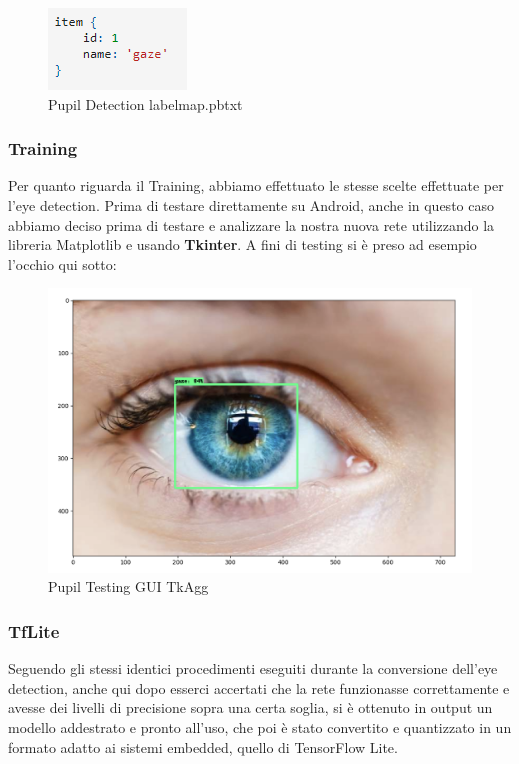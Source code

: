 \documentclass[11pt]{article}
\begin{document}
\begin{figure}[h]
\caption{Pupil Detection labelmap.pbtxt}
\centering
\includegraphics[scale=1]{img/item2.png}
\end{figure}

\subsubsection{Training}
Per quanto riguarda il Training, abbiamo effettuato le stesse scelte effettuate per l'eye detection.
\newline
Prima di testare direttamente su Android, anche in questo caso abbiamo deciso prima di testare e analizzare la nostra nuova rete utilizzando la libreria Matplotlib e usando \textbf{Tkinter}.
\newline
\newline
A fini di testing si è preso ad esempio l'occhio qui sotto:

\begin{figure}[h]
\caption{Pupil Testing GUI TkAgg }
\centering
\includegraphics[scale=0.18]{img/pupilla.png}
\end{figure}

\subsubsection{TfLite}
Seguendo gli stessi identici procedimenti eseguiti durante la conversione dell'eye detection, anche qui dopo esserci accertati che la rete funzionasse correttamente e avesse dei livelli di precisione sopra una certa soglia, si è ottenuto in output un modello addestrato
e pronto all’uso, che poi è stato convertito e quantizzato in un formato adatto ai sistemi embedded, quello di TensorFlow Lite.
\end{document}
